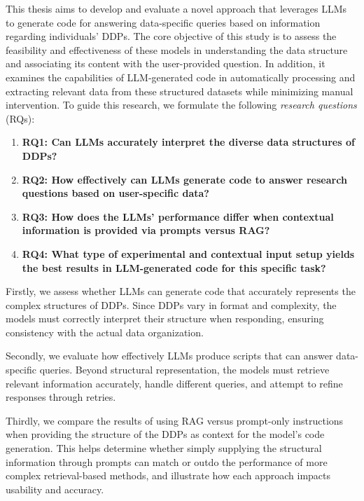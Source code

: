 \documentclass{DESSThesis}
\begin{document}
This thesis aims to develop and evaluate a novel approach that leverages LLMs to generate code for answering data-specific queries based on information regarding individuals' DDPs. The core objective of this study is to assess the feasibility and effectiveness of these models in understanding the data structure and associating its content with the user-provided question. In addition, it examines the capabilities of LLM-generated code in automatically processing and extracting relevant data from these structured datasets while minimizing manual intervention. To guide this research, we formulate the following \emph{research questions} (RQs):

\begin{enumerate}
    \item[] \textbf{RQ1: Can LLMs accurately interpret the diverse data structures of DDPs?}
    
    \item[] \textbf{RQ2: How effectively can LLMs generate code to answer research questions based on user-specific data?}

    \item[] \textbf{RQ3: How does the LLMs' performance differ when contextual information is provided via prompts versus RAG?}

    \item[] \textbf{RQ4: What type of experimental and contextual input setup yields the best results in LLM-generated code for this specific task?}
\end{enumerate}

Firstly, we assess whether LLMs can generate code that accurately represents the complex structures of DDPs. Since DDPs vary in format and complexity, the models must correctly interpret their structure when responding, ensuring consistency with the actual data organization.

Secondly, we evaluate how effectively LLMs produce scripts that can answer data-specific queries. Beyond structural representation, the models must retrieve relevant information accurately, handle different queries, and attempt to refine responses through retries. 

Thirdly, we compare the results of using RAG versus prompt-only instructions when providing the structure of the DDPs as context for the model's code generation. This helps determine whether simply supplying the structural information through prompts can match or outdo the performance of more complex retrieval-based methods, and illustrate how each approach impacts usability and accuracy.
\end{document}
